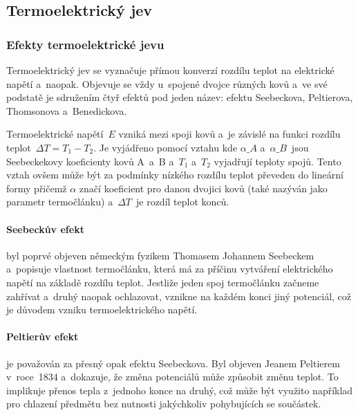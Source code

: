 \subsection{Termoelektrický jev}
\subsubsection{Efekty termoelektrické jevu}
\label{sec:efekty-termoelektrika}
Termoelektrický jev se vyznačuje přímou konverzí rozdílu teplot na elektrické
napětí a~naopak. Objevuje se vždy u~spojené dvojce různých kovů a~ve své
podstatě je sdružením čtyř efektů pod jeden název: efektu Seebeckova,
Peltierova, Thomsonova a~Benedickova.~

Termoelektrické napětí~$E$ vzniká mezi spoji kovů a~je závislé na funkci
rozdílu teplot~$\Delta T = T_1 - T_2$. Je vyjádřeno pomocí vztahu
kde $\alpha\_A$ a~$\alpha\_B$~jsou  Seebeckekovy koeficienty kovů A~a~B a~$T_1$
a~$T_2$ vyjadřují teploty spojů. Tento vztah ovšem může být za podmínky
nízkého rozdílu teplot převeden do lineární formy
přičemž $\alpha$ značí koeficient pro danou dvojici kovů (také nazýván
jako parametr termočlánku) a~$\Delta T$~je rozdíl teplot konců.~\cite{diplomka}

\paragraph{Seebeckův efekt} byl poprvé objeven německým fyzikem Thomasem
Johannem Seebeckem a~popisuje vlastnost termočlánku, která má za příčinu
vytváření elektrického napětí na základě rozdílu teplot. Jestliže jeden spoj
termočlánku začneme zahřívat a~druhý naopak ochlazovat, vznikne na každém konci
jiný potenciál, což je důvodem vzniku termoelektrického
napětí.~\cite{jreichl-seebeck}

\paragraph{Peltierův efekt} je považován za přesný opak efektu Seebeckova. Byl
objeven Jeanem Peltierem v~roce~1834 a~dokazuje, že změna potenciálů může
způsobit změnu teplot. To implikuje přenos tepla z~jednoho konce na druhý, což
může být využito například pro chlazení předmětu bez nutnosti jakýchkoliv
pohybujících se součástek.~

